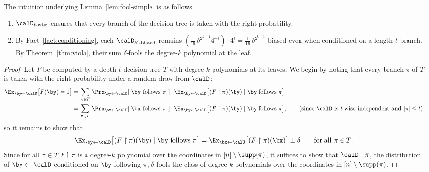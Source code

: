 \documentclass{toc}
\theoremstyle{plain}
\newcommand{\uhr}{\upharpoonright}
\begin{document}
The intuition underlying Lemma~\ref{lem:fool-simple} is as follows: 

\begin{enumerate}
\item $\calD_{\text{$t$-wise}}$ ensures that every branch of the decision tree is taken with the right probability. 
\item By Fact~\ref{fact:conditioning}, each $\calD_{\text{$\delta'$-biased}}$ remains $(\frac1{16}\,\delta^{2^{k-1}}4^{-t}) \cdot 4^t =  \frac1{16}\,\delta^{2^{k-1}}$-biased even when conditioned on a length-$t$ branch.  By Theorem~\ref{thm:viola}, their sum $\delta$-fools the degree-$k$ polynomial at the leaf. 
\end{enumerate} 


\begin{proof} 
Let $F$ be computed by a depth-$t$ decision tree $T$ with degree-$k$ polynomials at its leaves.  We begin by noting that every branch $\pi$ of $T$ is taken with the right probability under a random draw from $\calD$: 
\begin{align*}
\Ex_{\by\leftarrow\calD}\big[ F(\by) = 1\big] &= \sum_{\pi \in T}\, \Prx_{\by\leftarrow\calD}[\text{~$\by$ follows $\pi$~}] \cdot \Ex_{\by\leftarrow\calD}\big[ (F\uhr\pi)(\by)\mid \text{$\by$ follows $\pi$} \big] \\
&= \sum_{\pi \in T}\, \Prx_{\bx\leftarrow\calU}[\text{~$\bx$ follows $\pi$~}] \cdot \Ex_{\by\leftarrow\calD}\big[ (F\uhr\pi)(\by)\mid \text{$\by$ follows $\pi$} \big], \tag*{(since $\calD$ is $t$-wise independent and $|\pi|\le t$)}
\end{align*}
so it remains to show that 
\[ \Ex_{\by\leftarrow\calD}\big[ (F\uhr\pi)(\by)\mid \text{$\by$ follows $\pi$} \big]  = \Ex_{\bx\leftarrow\calU}\big[ (F\uhr\pi)(\bx) \big] \pm \delta \qquad \text{for all $\pi \in T$.}  \]
Since for all $\pi\in T$ $F \uhr \pi$ is a degree-$k$ polynomial over the coordinates in $[n] \setminus \supp(\pi)$, it suffices to show that $\calD \uhr \pi$, the distribution of $\by\leftarrow\calD$ conditioned on $\by$ following $\pi$, $\delta$-fools the class of degree-$k$ polynomials over the coordinates in $[n] \setminus \supp(\pi)$.
 

\end{proof}
\end{document}
